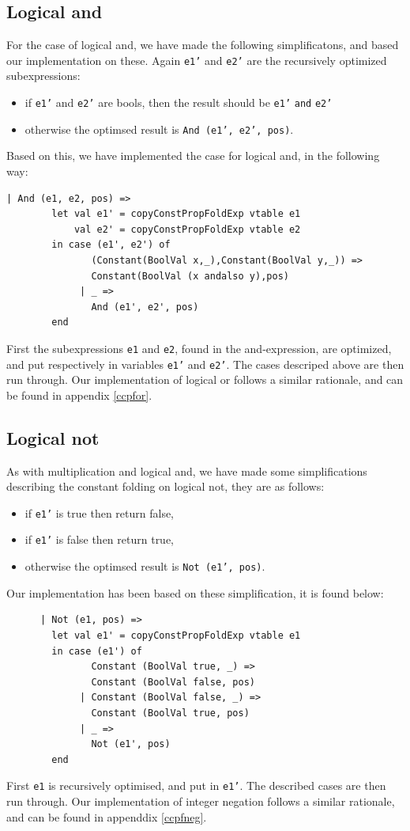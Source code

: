 \documentclass[11pt]{article}
\begin{document}
	\subsection{Logical and}
	For the case of logical and, we have made the following simplificatons, and based our implementation
	on these. Again \texttt{e1'} and \texttt{e2'} are the recursively optimized subexpressions:
	\begin{itemize}
	\item if \texttt{e1'} and \texttt{e2'} are bools, then the result should be
	\texttt{e1'} \texttt{and} \texttt{e2'}
	\item otherwise the optimsed result is  \texttt{And (e1', e2', pos)}.
	\end{itemize}
	Based on this, we have implemented the case for logical and, in the following way:
	\begin{lstlisting}[basicstyle=\small]
      | And (e1, e2, pos) =>
        let val e1' = copyConstPropFoldExp vtable e1
            val e2' = copyConstPropFoldExp vtable e2
        in case (e1', e2') of
               (Constant(BoolVal x,_),Constant(BoolVal y,_)) =>
               Constant(BoolVal (x andalso y),pos)
             | _ =>
               And (e1', e2', pos)
        end
	\end{lstlisting}
	First the subexpressions \texttt{e1} and \texttt{e2}, found in the and-expression, are
	optimized, and put respectively in variables \texttt{e1'} and \texttt{e2'}. The cases descriped above
	are then run through. Our implementation of logical or follows a similar rationale, and can be found in
	appendix \ref{ccpfor}.
	\subsection{Logical not}
	As with multiplication and logical and, we have made some simplifications describing the
	constant folding on logical not, they are as follows:
	\begin{itemize}
	\item if \texttt{e1'} is true then return false,
	\item if \texttt{e1'} is false then return true,
	\item otherwise the optimsed result is  \texttt{Not (e1', pos)}.
	\end{itemize}
	Our implementation has been based on these simplification, it is found below:
	\begin{lstlisting}
      | Not (e1, pos) =>
        let val e1' = copyConstPropFoldExp vtable e1
        in case (e1') of
               Constant (BoolVal true, _) =>
               Constant (BoolVal false, pos)
             | Constant (BoolVal false, _) =>
               Constant (BoolVal true, pos)
             | _ =>
               Not (e1', pos)
        end
	\end{lstlisting}
	First \texttt{e1} is recursively optimised, and put in \texttt{e1'}. The described cases are
	then run through. Our implementation of integer negation follows a similar rationale, and can
	be found in appenddix \ref{ccpfneg}.
\end{document}
